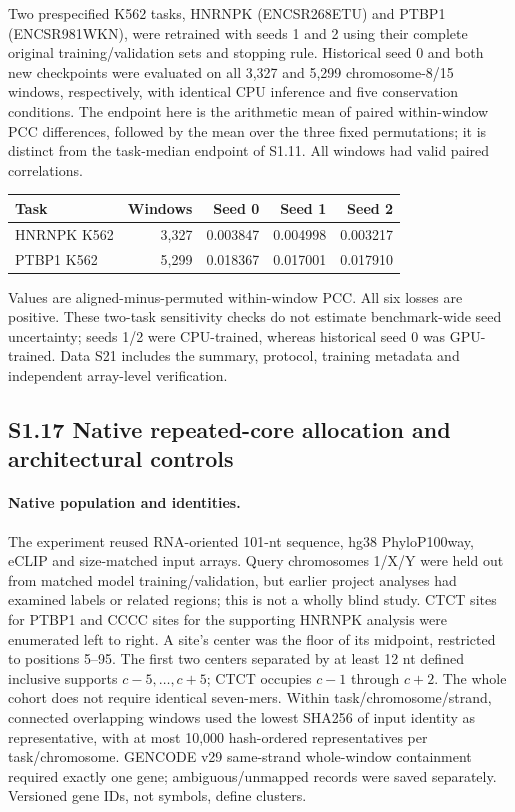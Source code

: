 \documentclass[11pt]{article}
\begin{document}
Two prespecified K562 tasks, HNRNPK (ENCSR268ETU) and PTBP1 (ENCSR981WKN), were retrained with seeds 1 and 2 using their complete original training/validation sets and stopping rule. Historical seed 0 and both new checkpoints were evaluated on all 3,327 and 5,299 chromosome-8/15 windows, respectively, with identical CPU inference and five conservation conditions. The endpoint here is the arithmetic mean of paired within-window PCC differences, followed by the mean over the three fixed permutations; it is distinct from the task-median endpoint of S1.11. All windows had valid paired correlations.

\begin{center}\small
\begin{tabular}{@{}lrrrr@{}}\toprule
Task & Windows & Seed 0 & Seed 1 & Seed 2 \\
\midrule
HNRNPK K562 & 3,327 & 0.003847 & 0.004998 & 0.003217 \\
PTBP1 K562 & 5,299 & 0.018367 & 0.017001 & 0.017910 \\
\bottomrule\end{tabular}\end{center}
Values are aligned-minus-permuted within-window PCC. All six losses are positive. These two-task sensitivity checks do not estimate benchmark-wide seed uncertainty; seeds 1/2 were CPU-trained, whereas historical seed 0 was GPU-trained. Data S21 includes the summary, protocol, training metadata and independent array-level verification.

\subsection*{S1.17 Native repeated-core allocation and architectural controls}

\paragraph{Native population and identities.} The experiment reused RNA-oriented 101-nt sequence, hg38 PhyloP100way, eCLIP and size-matched input arrays. Query chromosomes 1/X/Y were held out from matched model training/validation, but earlier project analyses had examined labels or related regions; this is not a wholly blind study. CTCT sites for PTBP1 and CCCC sites for the supporting HNRNPK analysis were enumerated left to right. A site's center was the floor of its midpoint, restricted to positions 5--95. The first two centers separated by at least 12 nt defined inclusive supports $c-5,\ldots,c+5$; CTCT occupies $c-1$ through $c+2$. The whole cohort does not require identical seven-mers. Within task/chromosome/strand, connected overlapping windows used the lowest SHA256 of input identity as representative, with at most 10,000 hash-ordered representatives per task/chromosome. GENCODE v29 same-strand whole-window containment required exactly one gene; ambiguous/unmapped records were saved separately. Versioned gene IDs, not symbols, define clusters.
\end{document}
